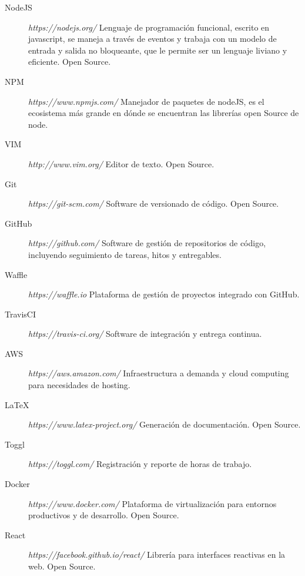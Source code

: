 \documentclass[a4paper,11pt]{article}
\begin{document}
\begin{description}

  \item[NodeJS] \textit{https://nodejs.org/} Lenguaje de programación
    funcional, escrito en javascript, se maneja a través de eventos y trabaja con
    un modelo de entrada y salida no bloqueante, que le permite ser un lenguaje
    liviano y eficiente. Open Source.

  \item[NPM] \textit{https://www.npmjs.com/} Manejador de paquetes de nodeJS,
    es el ecosistema más grande en dónde se encuentran las librerías open Source
    de node.

  \item[VIM] \textit{http://www.vim.org/} Editor de texto. Open Source.

  \item[Git] \textit{https://git-scm.com/} Software de versionado de código.
    Open Source.

  \item[GitHub] \textit{https://github.com/} Software de gestión de
    repositorios de código, incluyendo seguimiento de tareas, hitos y
    entregables.

  \item[Waffle] \textit{https://waffle.io} Plataforma de gestión de proyectos
    integrado con GitHub.

  \item[TravisCI] \textit{https://travis-ci.org/} Software de integración y
    entrega continua.

  \item[AWS] \textit{https://aws.amazon.com/} Infraestructura a demanda
    y cloud computing para necesidades de hosting.

  \item[LaTeX] \textit{https://www.latex-project.org/} Generación de
    documentación.  Open Source.

  \item[Toggl] \textit{https://toggl.com/} Registración y reporte de horas de
    trabajo.

  \item[Docker] \textit{https://www.docker.com/} Plataforma de virtualización
    para entornos productivos y de desarrollo. Open Source.

  \item[React] \textit{https://facebook.github.io/react/} Librería para
    interfaces reactivas en la web. Open Source.

\end{description}
\end{document}
